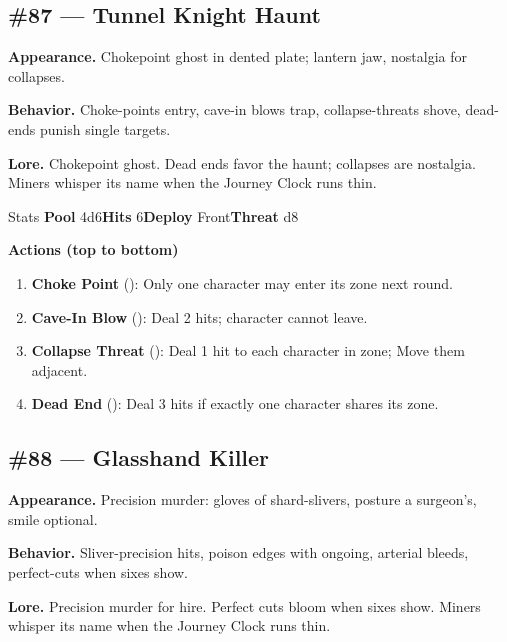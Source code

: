 \subsection*{\#87 --- Tunnel Knight Haunt}

\textbf{Appearance.} Chokepoint ghost in dented plate; lantern jaw, nostalgia for collapses.

\textbf{Behavior.} Choke-points entry, cave-in blows trap, collapse-threats shove, dead-ends punish single targets.

\textbf{Lore.} Chokepoint ghost. Dead ends favor the haunt; collapses are nostalgia. Miners whisper its name when the Journey Clock runs thin.

\begin{monsterentry}{Stats}
\textbf{Pool} 4d6\quad\textbf{Hits} 6\quad\textbf{Deploy} Front\quad\textbf{Threat} d8

\textbf{Actions (top to bottom)}
\begin{enumerate}\setlength{\itemsep}{0.15em}\setlength{\parskip}{0pt}
  \item \textbf{Choke Point} (\easy): Only one character may enter its zone next round.
  \item \textbf{Cave-In Blow} (\medium): Deal 2 hits; character cannot leave.
  \item \textbf{Collapse Threat} (\hard): Deal 1 hit to each character in zone; Move them adjacent.
  \item \textbf{Dead End} (\hard): Deal 3 hits if exactly one character shares its zone.
\end{enumerate}
\end{monsterentry}

\subsection*{\#88 --- Glasshand Killer}

\textbf{Appearance.} Precision murder: gloves of shard-slivers, posture a surgeon's, smile optional.

\textbf{Behavior.} Sliver-precision hits, poison edges with ongoing, arterial bleeds, perfect-cuts when sixes show.

\textbf{Lore.} Precision murder for hire. Perfect cuts bloom when sixes show. Miners whisper its name when the Journey Clock runs thin.

